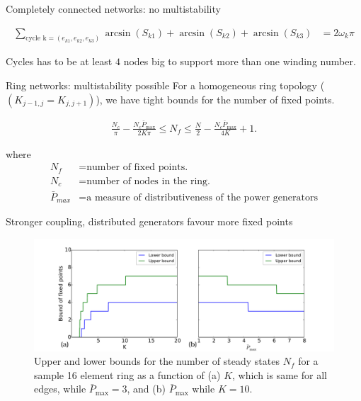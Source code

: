 \documentclass[xcolor=x11names,compress]{beamer}
\renewcommand{\(}{\begin{columns}}
\renewcommand{\)}{\end{columns}}
\newcommand{\<}[1]{\begin{column}{#1}}
\renewcommand{\>}{\end{column}}
\begin{document}
\begin{frame}{Completely connected networks: no multistability}

\begin{block}{}
\begin{align*}
    \sum_{\textrm{cycle k}=(e_{k1}, e_{k2}, e_{k3})} \arcsin(S_{k1})+\arcsin(S_{k2})+\arcsin(S_{k3}) & = 2 \omega_{k} \pi
\end{align*}
\end{block}

Cycles has to be at least $4$ nodes big to support more than one winding 
number.  
\end{frame}






\begin{frame}{Ring networks: multistability possible}
For a homogeneous ring topology ($\left(K_{j-1,j}=K_{j,j+1}\right)$), we 
have tight bounds for the number of fixed points.  

\begin{block}{}
\begin{align}
\frac{N_c}{\pi}-\frac{N_c\bar{P}_{\max}}{2K\pi} \leq N_{f} \leq \frac{N}{2} - \frac{N_c\bar{P}_{\max}}{4K}+1.
\end{align}
\end{block}

where
\begin{align*}
N_f&=\text{number of fixed points.  }\\
N_c&=\text{number of nodes in the ring.  }\\
\bar{P}_{max}&=\text{a measure of distributiveness of the power generators}
\end{align*}

\end{frame}


\begin{frame}{Stronger coupling, distributed generators favour more fixed points}
\begin{figure}
\begin{center}
\includegraphics[width=\columnwidth]{num_fps_k_p_ring}
\end{center}
\caption{
Upper and lower bounds for the number of steady states $N_f$ 
for a sample 16 element ring as a function of (a) $K$, which is same for all 
edges, while $\bar{P}_{\max}=3$, and (b) $\bar{P}_{\max}$ while $K=10$.  
}
\end{figure}
\end{frame}
\end{document}
